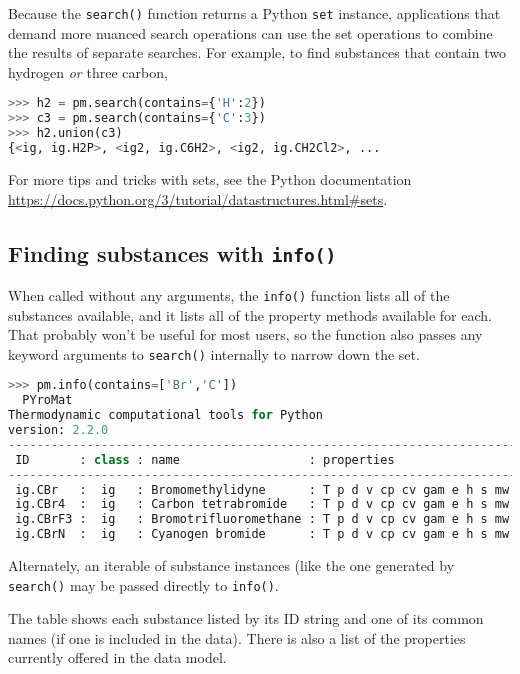 Because the \texttt{search()} function returns a Python \texttt{set} instance, applications that demand more nuanced search operations can use the set operations to combine the results of separate searches.  For example, to find substances that contain two hydrogen \emph{or} three carbon,
\begin{lstlisting}[language=Python]
>>> h2 = pm.search(contains={'H':2})
>>> c3 = pm.search(contains={'C':3})
>>> h2.union(c3)
{<ig, ig.H2P>, <ig2, ig.C6H2>, <ig2, ig.CH2Cl2>, ...
\end{lstlisting}
For more tips and tricks with sets, see the Python documentation \url{https://docs.python.org/3/tutorial/datastructures.html#sets}.

\subsection{Finding substances with \texttt{info()}}

When called without any arguments, the \texttt{info()} function lists all of the substances available, and it lists all of the property methods available for each.  That probably won't be useful for most users, so the function also passes any keyword arguments to \texttt{search()} internally to narrow down the set.
\begin{lstlisting}[language=Python,style=tinystyle]
>>> pm.info(contains=['Br','C'])
  PYroMat
Thermodynamic computational tools for Python
version: 2.2.0
------------------------------------------------------------------------------
 ID       : class : name                  : properties
------------------------------------------------------------------------------
 ig.CBr   :  ig   : Bromomethylidyne      : T p d v cp cv gam e h s mw R    
 ig.CBr4  :  ig   : Carbon tetrabromide   : T p d v cp cv gam e h s mw R    
 ig.CBrF3 :  ig   : Bromotrifluoromethane : T p d v cp cv gam e h s mw R    
 ig.CBrN  :  ig   : Cyanogen bromide      : T p d v cp cv gam e h s mw R    
\end{lstlisting}

Alternately, an iterable of substance instances (like the one generated by \texttt{search()} may be passed directly to \texttt{info()}.  

The table shows each substance listed by its ID string and one of its common names (if one is included in the data).  There is also a list of the properties currently offered in the data model.

